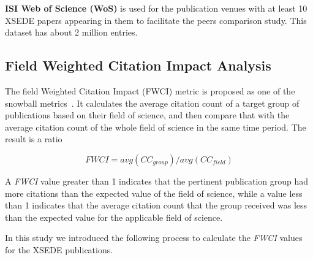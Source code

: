 \documentclass{sig-alternate}
\begin{document}
\parindent 0pt \textbf{ISI Web of Science (WoS)} is used for the publication
venues with at least 10 XSEDE papers appearing in them to facilitate
the peers comparison study. This dataset has about 2 million entries.

\subsection{Field Weighted Citation Impact Analysis}

The field Weighted Citation Impact (FWCI) metric is proposed as one of
the snowball metrics~\cite{colledge2014snowball}. It calculates the
average citation count of a target group of publications based on
their field of science, and then compare that with the average
citation count of the whole field of science in the same time
period. The result is a ratio

\[ FWCI = avg(CC_{group})/avg(CC_{field}) \]

A \emph{FWCI} value greater than 1 indicates that the pertinent
publication group had more citations than the expected value of the
field of science, while a value less than 1 indicates that the average
citation count that the group received was less than the expected
value for the applicable field of science.

In this study we introduced the following process to calculate the \emph{FWCI}
values for the XSEDE publications.
\end{document}
